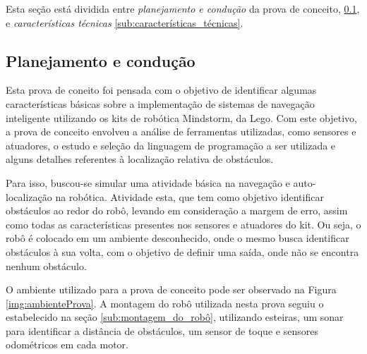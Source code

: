 	Esta seção está dividida entre \textit{planejamento e condução} da prova de conceito, \ref{sub:planejamento_e_condução}, e \textit{características técnicas} \ref{sub:características_técnicas}.

	\subsection{Planejamento e condução} %
	\label{sub:planejamento_e_condução}
	
		Esta prova de coneito foi pensada com o objetivo de identificar algumas características básicas sobre a implementação de sistemas de navegação inteligente utilizando os kits de robótica Mindstorm, da Lego. Com este objetivo, a prova de conceito envolveu a análise de ferramentas utilizadas, como sensores e atuadores, o estudo e seleção da linguagem de programação a ser utilizada e alguns detalhes referentes à localização relativa de obstáculos.

		Para isso, buscou-se simular uma atividade básica na navegação e auto-localização na robótica. Atividade esta, que tem como objetivo identificar obstáculos ao redor do robô, levando em consideração a margem de erro, assim como todas as características presentes nos sensores e atuadores do kit. Ou seja, o robô é colocado em um ambiente desconhecido, onde o mesmo busca identificar obstáculos à sua volta, com o objetivo de definir uma saída, onde não se encontra nenhum obstáculo.

		O ambiente utilizado para a prova de conceito pode ser observado na Figura \ref{img:ambienteProva}. A montagem do robô utilizada nesta prova seguiu o estabelecido na seção \ref{sub:montagem_do_robô}, utilizando esteiras, um sonar para identificar a distância de obstáculos, um sensor de toque e sensores odométricos em cada motor.

